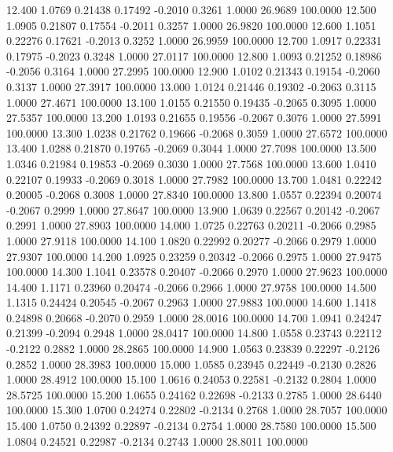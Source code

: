   12.400   1.0769   0.21438   0.17492  -0.2010   0.3261   1.0000  26.9689 100.0000
  12.500   1.0905   0.21807   0.17554  -0.2011   0.3257   1.0000  26.9820 100.0000
  12.600   1.1051   0.22276   0.17621  -0.2013   0.3252   1.0000  26.9959 100.0000
  12.700   1.0917   0.22331   0.17975  -0.2023   0.3248   1.0000  27.0117 100.0000
  12.800   1.0093   0.21252   0.18986  -0.2056   0.3164   1.0000  27.2995 100.0000
  12.900   1.0102   0.21343   0.19154  -0.2060   0.3137   1.0000  27.3917 100.0000
  13.000   1.0124   0.21446   0.19302  -0.2063   0.3115   1.0000  27.4671 100.0000
  13.100   1.0155   0.21550   0.19435  -0.2065   0.3095   1.0000  27.5357 100.0000
  13.200   1.0193   0.21655   0.19556  -0.2067   0.3076   1.0000  27.5991 100.0000
  13.300   1.0238   0.21762   0.19666  -0.2068   0.3059   1.0000  27.6572 100.0000
  13.400   1.0288   0.21870   0.19765  -0.2069   0.3044   1.0000  27.7098 100.0000
  13.500   1.0346   0.21984   0.19853  -0.2069   0.3030   1.0000  27.7568 100.0000
  13.600   1.0410   0.22107   0.19933  -0.2069   0.3018   1.0000  27.7982 100.0000
  13.700   1.0481   0.22242   0.20005  -0.2068   0.3008   1.0000  27.8340 100.0000
  13.800   1.0557   0.22394   0.20074  -0.2067   0.2999   1.0000  27.8647 100.0000
  13.900   1.0639   0.22567   0.20142  -0.2067   0.2991   1.0000  27.8903 100.0000
  14.000   1.0725   0.22763   0.20211  -0.2066   0.2985   1.0000  27.9118 100.0000
  14.100   1.0820   0.22992   0.20277  -0.2066   0.2979   1.0000  27.9307 100.0000
  14.200   1.0925   0.23259   0.20342  -0.2066   0.2975   1.0000  27.9475 100.0000
  14.300   1.1041   0.23578   0.20407  -0.2066   0.2970   1.0000  27.9623 100.0000
  14.400   1.1171   0.23960   0.20474  -0.2066   0.2966   1.0000  27.9758 100.0000
  14.500   1.1315   0.24424   0.20545  -0.2067   0.2963   1.0000  27.9883 100.0000
  14.600   1.1418   0.24898   0.20668  -0.2070   0.2959   1.0000  28.0016 100.0000
  14.700   1.0941   0.24247   0.21399  -0.2094   0.2948   1.0000  28.0417 100.0000
  14.800   1.0558   0.23743   0.22112  -0.2122   0.2882   1.0000  28.2865 100.0000
  14.900   1.0563   0.23839   0.22297  -0.2126   0.2852   1.0000  28.3983 100.0000
  15.000   1.0585   0.23945   0.22449  -0.2130   0.2826   1.0000  28.4912 100.0000
  15.100   1.0616   0.24053   0.22581  -0.2132   0.2804   1.0000  28.5725 100.0000
  15.200   1.0655   0.24162   0.22698  -0.2133   0.2785   1.0000  28.6440 100.0000
  15.300   1.0700   0.24274   0.22802  -0.2134   0.2768   1.0000  28.7057 100.0000
  15.400   1.0750   0.24392   0.22897  -0.2134   0.2754   1.0000  28.7580 100.0000
  15.500   1.0804   0.24521   0.22987  -0.2134   0.2743   1.0000  28.8011 100.0000
